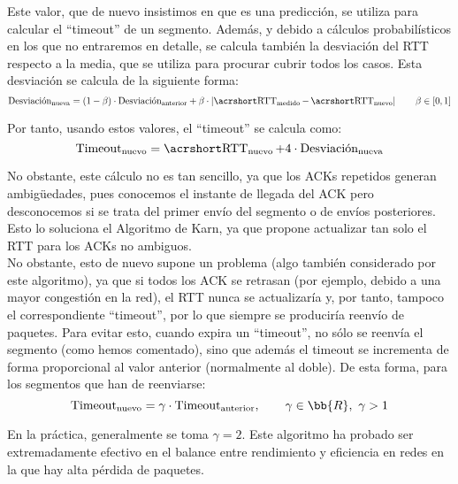 Este valor, que de nuevo insistimos en que es una predicción, se utiliza para calcular el ``timeout'' de un segmento. Además, y debido a cálculos probabilísticos en los que no entraremos en detalle, se calcula también la desviación del \acrshort{RTT} respecto a la media, que se utiliza para procurar cubrir todos los casos. Esta desviación se calcula de la siguiente forma:
\begin{equation*}
    \text{Desviación}_{\text{nueva}} = (1-\beta) \cdot \text{Desviación}_{\text{anterior}} + \beta \cdot \left|\rtt_{\text{medido}} - \rtt_{\text{nuevo}}\right|
    \qquad \beta \in [0,1]
\end{equation*}

Por tanto, usando estos valores, el ``timeout'' se calcula como:
\begin{equation*}
    \text{Timeout}_{\text{nuevo}} = \rtt_{\text{nuevo}} + 4 \cdot \text{Desviación}_{\text{nueva}}
\end{equation*}

No obstante, este cálculo no es tan sencillo, ya que los \acrshort{ACK}s repetidos generan ambigüedades, pues conocemos el instante de llegada del \acrshort{ACK} pero desconocemos si se trata del primer envío del segmento o de envíos posteriores. Esto lo soluciona el Algoritmo de Karn, ya que propone actualizar tan solo el \acrshort{RTT} para los \acrshort{ACK}s no ambiguos.\\

No obstante, esto de nuevo supone un problema (algo también considerado por este algoritmo), ya que si todos los \acrshort{ACK} se retrasan (por ejemplo, debido a una mayor congestión en la red), el \acrshort{RTT} nunca se actualizaría y, por tanto, tampoco el correspondiente ``timeout'', por lo que siempre se produciría reenvío de paquetes. Para evitar esto, cuando expira un ``timeout'', no sólo se reenvía el segmento (como hemos comentado), sino que además el timeout se incrementa de forma proporcional al valor anterior (normalmente al doble). De esta forma, para los segmentos que han de reenviarse:
\begin{equation*}
    \text{Timeout}_{\text{nuevo}} = \gamma \cdot \text{Timeout}_{\text{anterior}},\qquad \gamma\in \bb{R},\ \gamma > 1
\end{equation*}

En la práctica, generalmente se toma $\gamma = 2$. Este algoritmo ha probado ser extremadamente efectivo en el balance entre rendimiento y eficiencia en redes en la que hay alta pérdida de paquetes.

